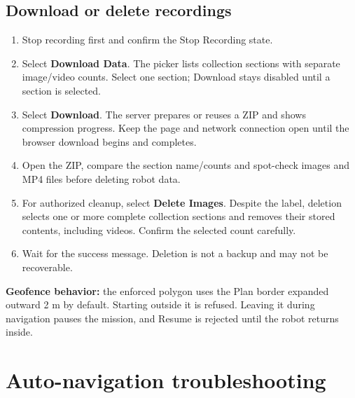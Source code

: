 \documentclass[
  10pt,
  letterpaper,
  openany]{report}
\providecommand{\tightlist}{%
  \setlength{\itemsep}{0pt}\setlength{\parskip}{0pt}}
\begin{document}
\subsection{Download or delete
recordings}\label{download-or-delete-recordings}

\begin{enumerate}
\tightlist
\item
  Stop recording first and confirm the Stop Recording state.
\item
  Select \textbf{Download Data}. The picker lists collection sections
  with separate image/video counts. Select one section; Download stays
  disabled until a section is selected.
\item
  Select \textbf{Download}. The server prepares or reuses a ZIP and
  shows compression progress. Keep the page and network connection open
  until the browser download begins and completes.
\item
  Open the ZIP, compare the section name/counts and spot-check images
  and MP4 files before deleting robot data.
\item
  For authorized cleanup, select \textbf{Delete Images}. Despite the
  label, deletion selects one or more complete collection sections and
  removes their stored contents, including videos. Confirm the selected
  count carefully.
\item
  Wait for the success message. Deletion is not a backup and may not be
  recoverable.
\end{enumerate}

\begin{manualnotice}

\textbf{Geofence behavior:} the enforced polygon uses the Plan border
expanded outward 2 m by default. Starting outside it is refused. Leaving
it during navigation pauses the mission, and Resume is rejected until
the robot returns inside.

\end{manualnotice}

\protect{}\label{nav-trouble}
\section{Auto-navigation
troubleshooting}\label{auto-navigation-troubleshooting}
\end{document}
